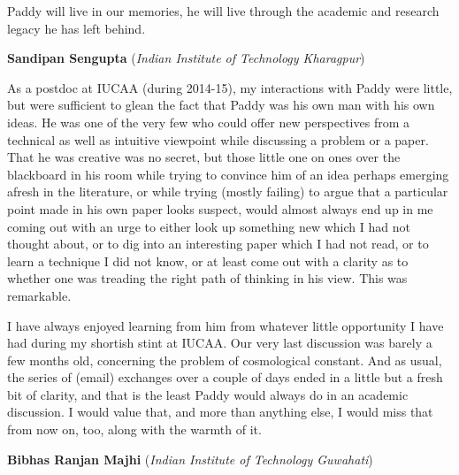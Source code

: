 \documentclass[prd, preprint, longbibliography, 12pt]{revtex4-2}
\begin{document}
Paddy will live in our memories, he will live through the  academic and research legacy he has left behind.


\bigskip
\bigskip
\centerline{{\bf Sandipan Sengupta} ({\it Indian Institute of Technology Kharagpur})}
\medskip
{}

\noindent As a postdoc at IUCAA (during 2014-15), my interactions with Paddy were little, but were
sufficient to glean the fact that Paddy was his own man with his own ideas. He was one of the very
few who could offer new perspectives from a technical as well as intuitive viewpoint while
discussing a problem or a paper. That he was creative was no secret, but those little one on ones
over the blackboard in his room while trying to convince him of an idea perhaps emerging afresh in
the literature, or while trying (mostly failing) to argue that a particular point made in his own paper
looks suspect, would almost always end up in me coming out with an urge to either look up
something new which I had not thought about, or to dig into an interesting paper which I had not
read, or to learn a technique I did not know, or at least come out with a clarity as to whether one was
treading the right path of thinking in his view. This was remarkable.

I have always enjoyed learning from him from whatever little opportunity I have had during my
shortish stint at IUCAA. Our very last discussion was barely a few months old, concerning the
problem of cosmological constant. And as usual, the series of (email) exchanges over a couple of
days ended in a little but a fresh bit of clarity, and that is the least Paddy would always do in an
academic discussion. I would value that, and more than anything else, I would miss that from now
on, too, along with the warmth of it.





\bigskip
\bigskip

\centerline{{\bf Bibhas Ranjan Majhi} ({\it Indian Institute of Technology Guwahati})}
\medskip
{}
\end{document}
